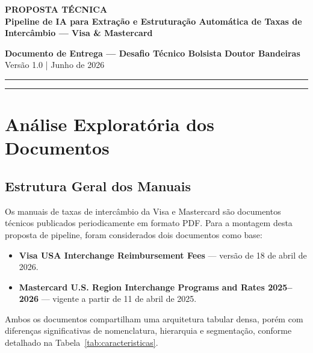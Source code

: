 \documentclass[12pt,a4paper]{article}
\begin{document}
\begin{center}
    {\large \textbf{\color{primaryColor}PROPOSTA TÉCNICA}} \\[0.3cm]
    {\Large \textbf{\color{primaryColor}Pipeline de IA para Extração e Estruturação Automática de Taxas de Intercâmbio --- Visa \& Mastercard}} \\[0.6cm]
    
    \begin{minipage}{0.9\textwidth}
        \centering
        \small
        \color{darkGray}
        \textbf{Documento de Entrega --- Desafio Técnico Bolsista Doutor Bandeiras} \\
        Versão 1.0 \quad | \quad Junho de 2026
    \end{minipage}
\end{center}

\vspace{0.5cm}
\noindent\rule{\textwidth}{1.5pt}
\vspace{0.2cm}

\tableofcontents
\vspace{0.8cm}
\noindent\rule{\textwidth}{0.5pt}
\vspace{0.8cm}

\section{Análise Exploratória dos Documentos}

\subsection{Estrutura Geral dos Manuais}

Os manuais de taxas de intercâmbio da Visa e Mastercard são documentos técnicos publicados periodicamente em formato PDF. Para a montagem desta proposta de pipeline, foram considerados dois documentos como base:
\begin{itemize}
    \item \textbf{Visa USA Interchange Reimbursement Fees} --- versão de 18 de abril de 2026.
    \item \textbf{Mastercard U.S. Region Interchange Programs and Rates 2025–2026} --- vigente a partir de 11 de abril de 2025.
\end{itemize}

Ambos os documentos compartilham uma arquitetura tabular densa, porém com diferenças significativas de nomenclatura, hierarquia e segmentação, conforme detalhado na Tabela~\ref{tab:caracteristicas}.
\end{document}
